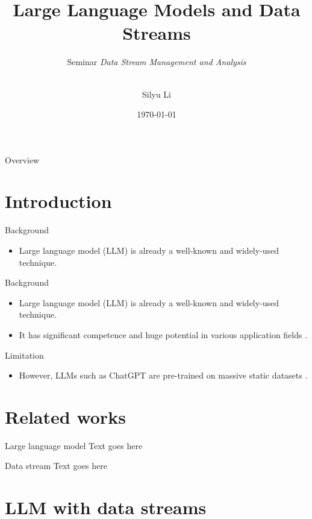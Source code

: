 \documentclass[t]{beamer}
\title{Large Language Models and Data Streams}
\subtitle{
  Seminar \textsl{Data Stream Management and Analysis}\\[1ex]
  \insertdate\\[1ex]
  \insertauthor
}
\date{\today}
\author{Silyu Li}
\institute{RWTH Aachen University}
\begin{document}
\begin{frame}[plain]
  \titlepage
\end{frame}

\begin{frame}{Overview}
  \tableofcontents
\end{frame}

\section{Introduction}
\begin{frame}{Background}
  \begin{itemize}
    \item Large language model (LLM) is already a well-known and widely-used technique.
  \end{itemize}
\end{frame}

\begin{frame}{Background}
  \begin{itemize}
    \item Large language model (LLM) is already a well-known and widely-used technique.
    \item It has significant competence and huge potential in various application fields \cite{Liu23}.
  \end{itemize}
\end{frame}

\begin{frame}{Limitation}
  \begin{itemize}
    \item However, LLMs such as ChatGPT are pre-trained on massive static datasets \cite{Gupta23}.
  \end{itemize}
\end{frame}

\section{Related works}
\begin{frame}{Large language model}
  Text goes here
\end{frame}

\begin{frame}{Data stream}
  Text goes here
\end{frame}

\section{LLM with data streams}
\end{document}
